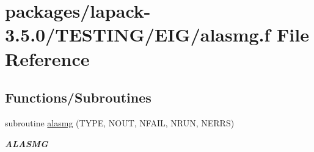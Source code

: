 \hypertarget{alasmg_8f}{}\section{packages/lapack-\/3.5.0/\+T\+E\+S\+T\+I\+N\+G/\+E\+I\+G/alasmg.f File Reference}
\label{alasmg_8f}
\subsection*{Functions/\+Subroutines}
\begin{DoxyCompactItemize}
\item 
subroutine \hyperlink{group__aux__eig_ga09ab1f017a25bb3acfed18a650325888}{alasmg} (T\+Y\+P\+E, N\+O\+U\+T, N\+F\+A\+I\+L, N\+R\+U\+N, N\+E\+R\+R\+S)
\begin{DoxyCompactList}\small\item\em {\bfseries A\+L\+A\+S\+M\+G} \end{DoxyCompactList}\end{DoxyCompactItemize}
